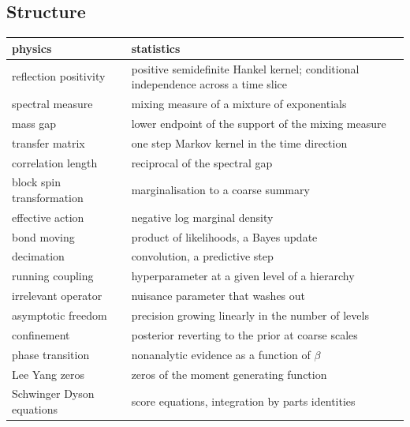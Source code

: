 \subsection{Structure}
\begin{center}
\small
\begin{tabular}{p{1.95in}p{2.2in}}
\toprule
physics & statistics \\ \midrule
reflection positivity & positive semidefinite Hankel kernel; conditional independence across a time slice \\
spectral measure & mixing measure of a mixture of exponentials \\
mass gap & lower endpoint of the support of the mixing measure \\
transfer matrix & one step Markov kernel in the time direction \\
correlation length & reciprocal of the spectral gap \\
block spin transformation & marginalisation to a coarse summary \\
effective action & negative log marginal density \\
bond moving & product of likelihoods, a Bayes update \\
decimation & convolution, a predictive step \\
running coupling & hyperparameter at a given level of a hierarchy \\
irrelevant operator & nuisance parameter that washes out \\
asymptotic freedom & precision growing linearly in the number of levels \\
confinement & posterior reverting to the prior at coarse scales \\
phase transition & nonanalytic evidence as a function of $\beta$ \\
Lee Yang zeros & zeros of the moment generating function \\
Schwinger Dyson equations & score equations, integration by parts identities \\
\bottomrule
\end{tabular}
\end{center}

